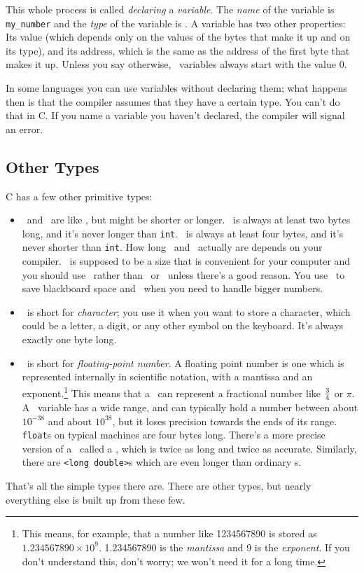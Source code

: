     This whole process is called {\em declaring}\/ a {\em variable}\/.
The {\em name}\/ of the variable is {\tt my\_number} and the {\em type}\/
of the variable is \int.  A variable has two other properties:  Its
value (which depends only on the values of the bytes that make it up and
on its type), and its address, which is the same as the address of the
first byte that makes it up.  Unless you say otherwise, \int\
variables always start with the value 0.

    In some languages you can use variables without declaring them; what
happens then is that the compiler assumes that they have a certain type.
You can't do that in C.  If you name a variable you haven't declared,
the compiler will signal an error.

\subsection{Other Types}

    C has a few other primitive types:

\begin{itemize}

\item \shortint\  and \longint\  are like \int, but might
be shorter or longer.  \shortint\ is always at least two bytes long, and
it's never longer than {\tt int}.  \longint\ is always at least four
bytes, and it's never shorter than {\tt int}.  How long \shortint\ and
\longint\ actually
are depends on your compiler.  \int\ is supposed to be a size that is
convenient for your computer and you should use \int\ rather than
\longint\ or \shortint\ unless there's a good
reason.  You use \shortint\ to save blackboard space and
\longint\ when you need to handle bigger numbers.

\item \char\ is short for {\em character}\/; you use it when you
want to store a character, which could be a letter, a digit, or any
other symbol on the keyboard.  It's always exactly one byte long.

\item \float\ is short for {\em floating-point number}\/.  A
floating point number is one which is represented internally in
scientific notation, with a mantissa and an exponent.\footnote{This
means, for example, that a number like 1234567890 is stored as
$1.234567890\times 10^9$.  1.234567890 is the {\em mantissa}\/ and 9 is
the {\em exponent}\/.  If you don't understand this, don't worry; we
won't need it for a long time.} This means that a \float\ can represent
a fractional number like $3\over 4$ or $\pi$.  A \float\ variable has a
wide range, and can typically hold a number between about $10^{-38}$ and
about $10^{38}$, but it loses precision towards the ends of its range.
{\tt float}s on typical machines are four bytes long.  There's a more
precise version of a \float\ called a \double, which is twice as long
and twice as accurate.  Similarly, there are
\verb+<+{\tt long double}\verb+>+s which are even longer than ordinary
\double s.

\end{itemize}

That's all the simple types there are.  There are other types, but
nearly everything else is built up from these few.



